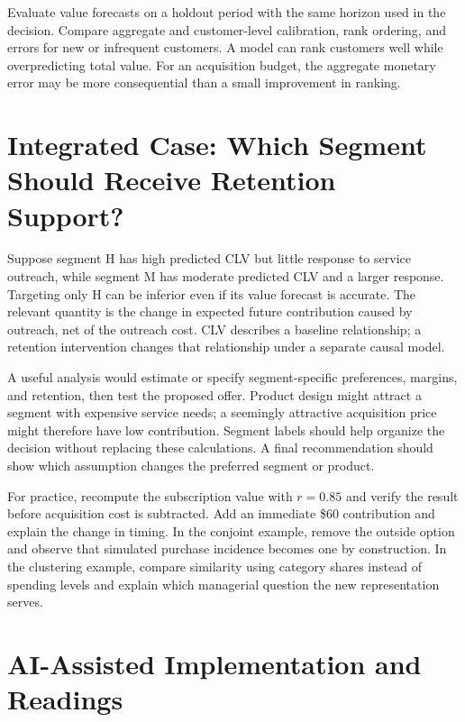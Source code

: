 Evaluate value forecasts on a holdout period with the same horizon used
in the decision. Compare aggregate and customer-level calibration, rank
ordering, and errors for new or infrequent customers. A model can rank
customers well while overpredicting total value. For an acquisition
budget, the aggregate monetary error may be more consequential than a
small improvement in ranking.

\hypertarget{M04-integrated-case-which-segment-should-receive-retention-support}{%
\section{Integrated Case: Which Segment Should Receive Retention
Support?}\label{M04-integrated-case-which-segment-should-receive-retention-support}}

\noindent Suppose segment H has high predicted CLV but little response to service
outreach, while segment M has moderate predicted CLV and a larger
response. Targeting only H can be inferior even if its value forecast is
accurate. The relevant quantity is the change in expected future
contribution caused by outreach, net of the outreach cost. CLV describes
a baseline relationship; a retention intervention changes that
relationship under a separate causal model.

A useful analysis would estimate or specify segment-specific
preferences, margins, and retention, then test the proposed offer.
Product design might attract a segment with expensive service needs; a
seemingly attractive acquisition price might therefore have low
contribution. Segment labels should help organize the decision without
replacing these calculations. A final recommendation should show which
assumption changes the preferred segment or product.

For practice, recompute the subscription value with \(r=0.85\) and
verify the result before acquisition cost is subtracted. Add an
immediate \$60 contribution and explain the change in timing. In the
conjoint example, remove the outside option and observe that simulated
purchase incidence becomes one by construction. In the clustering
example, compare similarity using category shares instead of spending
levels and explain which managerial question the new representation
serves.

\hypertarget{M04-ai-assisted-implementation-and-readings}{%
\section{AI-Assisted Implementation and
Readings}\label{M04-ai-assisted-implementation-and-readings}}


